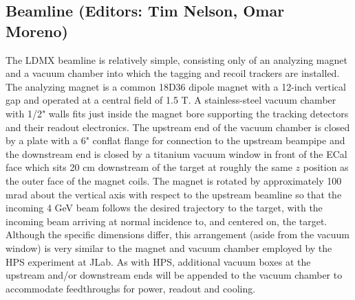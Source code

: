 
\subsection{Beamline (Editors: Tim Nelson, Omar Moreno)}

The LDMX beamline is relatively simple, consisting only of an analyzing magnet and a vacuum chamber into which the tagging and recoil trackers are installed.  The analyzing magnet is a common 18D36 dipole magnet with a 12-inch vertical gap and operated at a central field of 1.5 T.  A stainless-steel vacuum chamber with 1/2" walls fits just inside the magnet bore supporting the tracking detectors and their readout electronics. The upstream end of the vacuum chamber is closed by a plate with a 6" conflat flange for connection to the upstream beampipe and the downstream end is closed by a titanium vacuum window in front of the ECal face which sits 20 cm downstream of the target at roughly the same $z$ position as the outer face of the magnet coils.  The magnet is rotated by approximately 100 mrad about the vertical axis with respect to the upstream beamline so that the incoming 4 GeV beam follows the desired trajectory to the target, with the incoming beam arriving at normal incidence to, and centered on, the target.  Although the specific dimensions differ, this arrangement (aside from the vacuum window) is very similar to the magnet and vacuum chamber employed by the HPS experiment at JLab.  As with HPS, additional vacuum boxes at the upstream and/or downstream ends will be appended to the vacuum chamber to accommodate feedthroughs for power, readout and cooling.  


